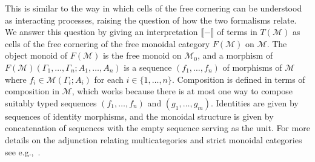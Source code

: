 \documentclass[twoside,11pt,final]{entics}
\newcommand{\seq}{,\!\ldots\!,}
\begin{document}
This is similar to the way in which cells of the free cornering can be understood as interacting processes, raising the question of how the two formalisms relate. We answer this question by giving an interpretation $\llbracket - \rrbracket$ of terms in $T(\mathcal{M})$ as cells of  the free cornering of the free monoidal category $F(\mathcal{M})$ on $\mathcal{M}$. The object monoid of $F(\mathcal{M})$ is the free monoid on $\mathcal{M}_0$, and a morphism of $F(\mathcal{M})(\Gamma_1 \seq \Gamma_n;A_1\seq A_n)$ is a sequence $(f_1\seq f_n)$ of morphisms of $\mathcal{M}$ where $f_i \in \mathcal{M}(\Gamma_i;A_i)$ for each $i \in \{1 \seq n\}$. Composition is defined in terms of composition in $\mathcal{M}$, which works because there is at most one way to compose suitably typed sequences $(f_1\seq f_n)$ and $(g_1 \seq g_m)$. Identities are given by sequences of identity morphisms, and the monoidal structure is given by concatenation of sequences with the empty sequence serving as the unit. For more details on the adjunction relating multicategories and strict monoidal categories see e.g.,~\cite{Leinster2004}.
\end{document}
